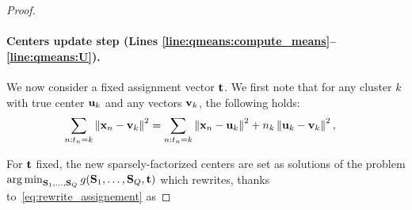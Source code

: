\begin{proof}
\paragraph{Centers update step (Lines \ref{line:qmeans:compute_means}--\ref{line:qmeans:U}).} We now consider a fixed assignment vector ${\mathbf{t}}$. We first note that for any cluster $k$ with true center ${\mathbf{u}}_k$ and any vectors ${\mathbf{v}}_k$, the following holds:
\small
\begin{align}
    \label{eq:rewrite_assignement}
	\sum_{n:t_n = k} \left \| {\mathbf{x}}_n -{\mathbf{v}}_k\right \|^2
	&= \sum_{n:t_n = k} \left \| {\mathbf{x}}_n-{\mathbf{u}}_k\right \|^2 + n_k \left \| {\mathbf{u}}_k-{\mathbf{v}}_k\right \|^2,
\end{align}
\normalsize



For ${\mathbf{t}}$ fixed, the new sparsely-factorized centers are set as solutions of the problem $\operatorname*{arg\,min}_{{\mathbf{S}}_1, \ldots,{\mathbf{S}}_Q} g({\mathbf{S}}_1, \ldots,{\mathbf{S}}_Q, {\mathbf{t}})$ which rewrites,  thanks to~\eqref{eq:rewrite_assignement} as
%



\end{proof}
